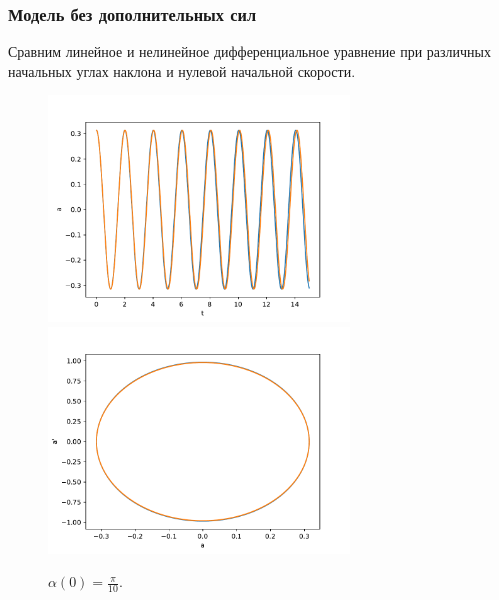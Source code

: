        \subsubsection{Модель без дополнительных сил}
            Сравним линейное и нелинейное дифференциальное уравнение при различных начальных углах наклона и нулевой начальной скорости.

            \begin{figure}[H]
                \centering
                \includegraphics[width=8cm]{pictures/12resonance10.pdf}
                \includegraphics[width=8cm]{pictures/12resonance10p.pdf}
                \caption{$\alpha(0) = \frac{\pi}{10}$.}
            \end{figure}

